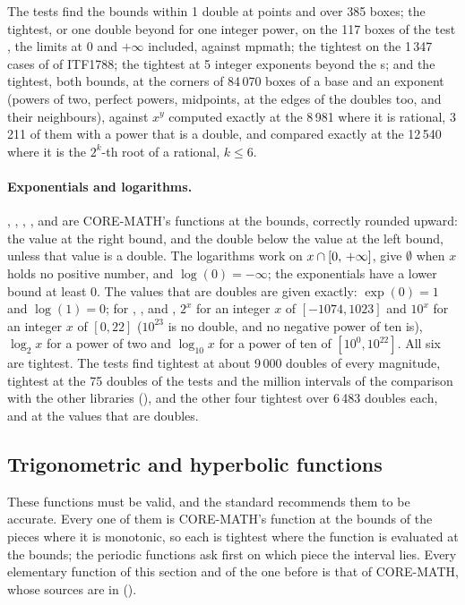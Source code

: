 The tests find the bounds within 1 double at points and over 385 boxes; the
tightest, or one double beyond for one integer power, on the 117 boxes of
the test , the limits at $0$ and $+\infty$ included, against
mpmath; the tightest on the 1\,347 cases of  of ITF1788; the
tightest at 5 integer exponents beyond the s; and the tightest,
both bounds, at the corners of 84\,070 boxes of a base and an exponent
(powers of two, perfect powers, midpoints, at the edges of the doubles too,
and their neighbours), against $x^y$ computed exactly at the 8\,981 where
it is rational, 3\,211 of them with a power that is a double, and compared
exactly at the 12\,540 where it is the $2^k$-th root of a rational,
$k\leq6$.

\paragraph{Exponentials and logarithms.}
, , , ,  and
 are CORE-MATH's functions at the bounds, correctly rounded
upward: the value at the right bound, and the double below the value at the
left bound, unless that value is a double. The logarithms work on
$x\cap[0,\,+\infty]$, give $\emptyset$ when $x$ holds no positive
number, and $\log(0)=-\infty$; the exponentials have a lower bound at least
$0$. The values that are doubles are given exactly: $\exp(0)=1$ and
$\log(1)=0$; for , ,  and
,\newinvfive{} $2^x$ for an integer $x$ of $[-1074, 1023]$ and
$10^x$ for an integer $x$ of $[0, 22]$ ($10^{23}$ is no double, and no
negative power of ten is), $\log_2 x$ for a power of two and $\log_{10}x$
for a power of ten of $[10^0, 10^{22}]$. All six are tightest. The tests
find  tightest at about 9\,000 doubles of every magnitude,  tightest at the 75
doubles of the tests and the million intervals of the comparison with the
other libraries (), and the other four tightest over
6\,483 doubles each, and at the values that are doubles.

\subsection{Trigonometric and hyperbolic functions}\label{sec:accuracy-trig}

These functions must be valid, and the standard recommends them to be
accurate. Every one of them is CORE-MATH's function at the bounds of the
pieces where it is monotonic, so each is tightest where the function is
evaluated at the bounds; the periodic functions ask first on which piece
the interval lies. Every elementary function of this section and of the
one before is that of CORE-MATH, whose sources are in 
().

